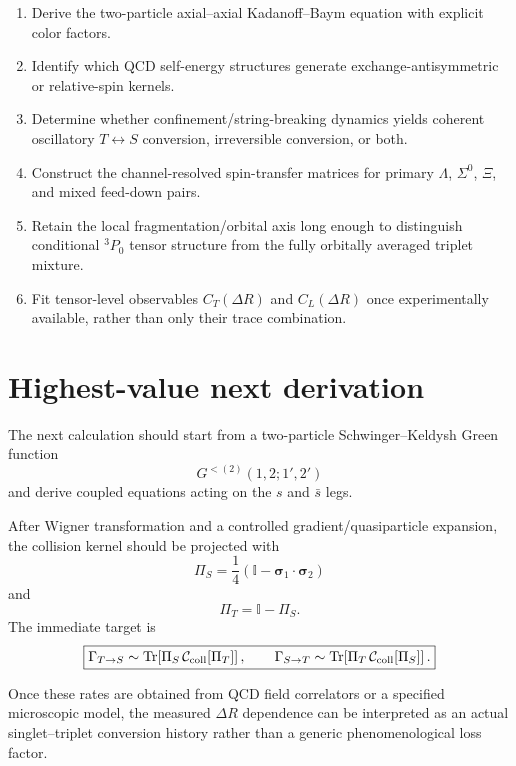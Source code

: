 \documentclass[11pt]{article}
\newcommand{\Id}{\mathbb I}
\newcommand{\Trc}{\operatorname{Tr}}
\begin{document}
\begin{enumerate}[leftmargin=1.5em]
\item Derive the two-particle axial--axial Kadanoff--Baym equation with explicit color factors.
\item Identify which QCD self-energy structures generate exchange-antisymmetric or relative-spin
      kernels.
\item Determine whether confinement/string-breaking dynamics yields coherent oscillatory
      $T\leftrightarrow S$ conversion, irreversible conversion, or both.
\item Construct the channel-resolved spin-transfer matrices for primary $\Lambda$, $\Sigma^0$,
      $\Xi$, and mixed feed-down pairs.
\item Retain the local fragmentation/orbital axis long enough to distinguish conditional
      ${}^3P_0$ tensor structure from the fully orbitally averaged triplet mixture.
\item Fit tensor-level observables $C_T(\Delta R)$ and $C_L(\Delta R)$ once experimentally available,
      rather than only their trace combination.
\end{enumerate}

\section{Highest-value next derivation}

The next calculation should start from a two-particle Schwinger--Keldysh Green function
\begin{equation}
G^{<(2)}(1,2;1',2')
\end{equation}
and derive coupled equations acting on the $s$ and $\bar s$ legs.

After Wigner transformation and a controlled gradient/quasiparticle expansion, the collision kernel
should be projected with
\begin{equation}
\Pi_S
=
\frac14
(\Id-\bm\sigma_1\cdot\bm\sigma_2)
\end{equation}
and
\begin{equation}
\Pi_T=\Id-\Pi_S.
\end{equation}
The immediate target is
\begin{equation}
\boxed{
\Gamma_{T\to S}
\sim
\Trc\!\left[
\Pi_S\,\mathcal C_{\rm coll}[\Pi_T]
\right],
\qquad
\Gamma_{S\to T}
\sim
\Trc\!\left[
\Pi_T\,\mathcal C_{\rm coll}[\Pi_S]
\right].
}
\end{equation}

Once these rates are obtained from QCD field correlators or a specified microscopic model, the
measured $\Delta R$ dependence can be interpreted as an actual singlet--triplet conversion history
rather than a generic phenomenological loss factor.
\end{document}
